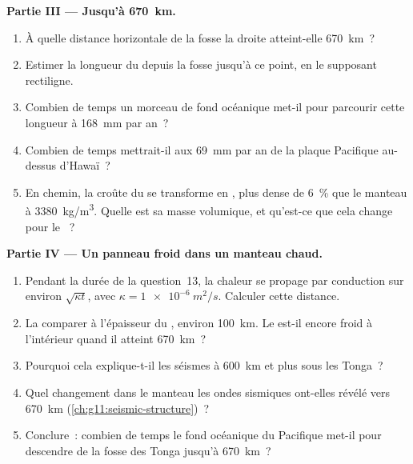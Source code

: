 \begin{problem}
\medskip
\noindent\textbf{Partie III --- Jusqu'à \qty{670}{km}.}
\begin{enumerate}[resume]
  \item À quelle distance horizontale de la fosse la droite atteint-elle
        \qty{670}{km}~?
  \item Estimer la longueur du  depuis la fosse jusqu'à
        ce point, en le supposant rectiligne.
  \item Combien de temps un morceau de fond océanique met-il pour parcourir
        cette longueur à \qty{168}{mm} par an~?
  \item Combien de temps mettrait-il aux \qty{69}{mm} par an de la plaque
        Pacifique au-dessus d'Hawaï~?
  \item En chemin, la croûte du  se transforme en
        , plus dense de \qty{6}{\percent} que le manteau à
        \qty{3380}{kg/m^3}. Quelle est sa masse volumique, et qu'est-ce que
        cela change pour le ~?
\end{enumerate}

\medskip
\noindent\textbf{Partie IV --- Un panneau froid dans un manteau chaud.}
\begin{enumerate}[resume]
  \item Pendant la durée de la question~13, la chaleur se propage par
        conduction sur environ $\sqrt{\kappa t}$, avec
        $\kappa = \qty{1e-6}{m^2/s}$. Calculer cette distance.
  \item La comparer à l'épaisseur du , environ
        \qty{100}{km}. Le  est-il encore froid à l'intérieur quand il
        atteint \qty{670}{km}~?
  \item Pourquoi cela explique-t-il les séismes à \qty{600}{km} et plus sous
        les Tonga~?
  \item Quel changement dans le manteau les ondes sismiques ont-elles
        révélé vers \qty{670}{km} (\cref{ch:g11:seismic-structure})~?
  \item Conclure~: combien de temps le fond océanique du Pacifique met-il
        pour descendre de la fosse des Tonga jusqu'à \qty{670}{km}~?
\end{enumerate}
\end{problem}
